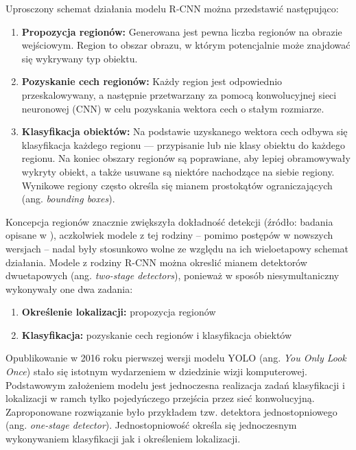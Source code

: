 Uprosczony schemat działania modelu R-CNN można przedstawić następująco:
\begin{enumerate}
    \item \textbf{Propozycja regionów:} Generowana jest pewna liczba regionów na obrazie wejściowym. Region to obszar obrazu, w którym potencjalnie może znajdować się wykrywany typ obiektu.
    \item \textbf{Pozyskanie cech regionów:} Każdy region jest odpowiednio przeskalowywany, a następnie przetwarzany za pomocą konwolucyjnej sieci neuronowej (CNN) w celu pozyskania wektora cech o stałym rozmiarze.
    \item \textbf{Klasyfikacja obiektów:} Na podstawie uzyskanego wektora cech odbywa się klasyfikacja każdego regionu --- przypisanie lub nie klasy obiektu do każdego regionu. Na koniec obszary regionów są poprawiane, aby lepiej obramowywały wykryty obiekt, a także usuwane są niektóre nachodzące na siebie regiony. Wynikowe regiony często określa się mianem prostokątów ograniczających (ang. \emph{bounding boxes}).
\end{enumerate}

 Koncepcja regionów znacznie zwiększyła dokładność detekcji (źródło: badania opisane w \cite{RCNN, Fast-RCNN, Faster-RCNN}), aczkolwiek modele z tej rodziny -- pomimo postępów w nowszych wersjach -- nadal były stosunkowo wolne ze względu na ich wieloetapowy schemat działania. Modele z rodziny R-CNN można okreslić mianem detektorów dwuetapowych (ang. \emph{two-stage detectors}), ponieważ w sposób niesymultaniczny wykonywały one dwa zadania:
\begin{enumerate}
    \item \textbf{Określenie lokalizacji:} propozycja regionów
    \item \textbf{Klasyfikacja:} pozyskanie cech regionów i klasyfikacja obiektów
\end{enumerate}

Opublikowanie w 2016 roku pierwszej wersji modelu YOLO (ang. \emph{You Only Look Once}) \cite{yolo_pierwszy_artykul} stało się istotnym wydarzeniem w dziedzinie wizji komputerowej. Podstawowym założeniem modelu jest jednoczesna realizacja zadań klasyfikacji i lokalizacji w ramch tylko pojedyńczego przejścia przez sieć konwolucyjną.  
Zaproponowane rozwiązanie było przykładem tzw. detektora jednostopniowego (ang. \emph{one-stage detector}). Jednostopniowość określa się jednoczesnym wykonywaniem klasyfikacji jak i określeniem lokalizacji.

